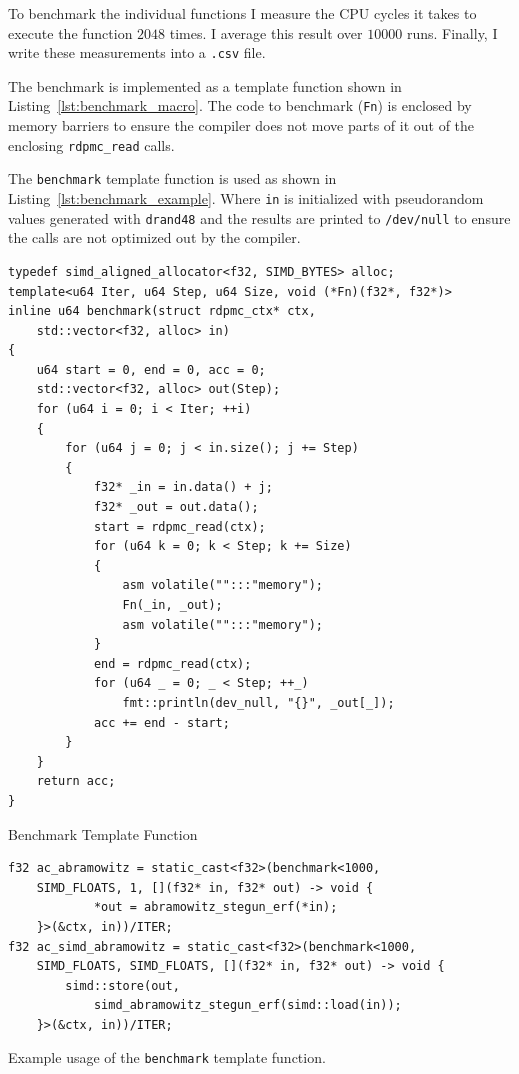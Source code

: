 \documentclass[a4paper, 11pt]{memoir}
\begin{document}
    To benchmark the individual functions I measure the CPU cycles it takes to execute the function $2048$ times. I average
    this result over $10000$ runs. Finally, I write these measurements into a \texttt{.csv} file.

    The benchmark is implemented as a template function shown in Listing~\ref{lst:benchmark_macro}. The code to benchmark
    (\texttt{Fn}) is enclosed by memory barriers to ensure the compiler does not move parts of it out of the
    enclosing \texttt{rdpmc_read} calls.

    The \texttt{benchmark} template function is used as shown in Listing~\ref{lst:benchmark_example}. Where
    \texttt{in} is initialized with pseudorandom values generated with \texttt{drand48} and the results
    are printed to \texttt{/dev/null} to ensure the calls are not optimized out by the compiler.

    \begin{listing}[t]
        \begin{verbatim}
typedef simd_aligned_allocator<f32, SIMD_BYTES> alloc;
template<u64 Iter, u64 Step, u64 Size, void (*Fn)(f32*, f32*)>
inline u64 benchmark(struct rdpmc_ctx* ctx,
    std::vector<f32, alloc> in)
{
    u64 start = 0, end = 0, acc = 0;
    std::vector<f32, alloc> out(Step);
    for (u64 i = 0; i < Iter; ++i)
    {
        for (u64 j = 0; j < in.size(); j += Step)
        {
            f32* _in = in.data() + j;
            f32* _out = out.data();
            start = rdpmc_read(ctx);
            for (u64 k = 0; k < Step; k += Size)
            {
                asm volatile("":::"memory");
                Fn(_in, _out);
                asm volatile("":::"memory");
            }
            end = rdpmc_read(ctx);
            for (u64 _ = 0; _ < Step; ++_)
                fmt::println(dev_null, "{}", _out[_]);
            acc += end - start;
        }
    }
    return acc;
}
        \end{verbatim}
        \caption{Benchmark Template Function}
        \label{lst:benchmark_macro}
    \end{listing}

    \begin{listing}[t]
        \begin{verbatim}
f32 ac_abramowitz = static_cast<f32>(benchmark<1000,
    SIMD_FLOATS, 1, [](f32* in, f32* out) -> void {
            *out = abramowitz_stegun_erf(*in);
    }>(&ctx, in))/ITER;
f32 ac_simd_abramowitz = static_cast<f32>(benchmark<1000,
    SIMD_FLOATS, SIMD_FLOATS, [](f32* in, f32* out) -> void {
        simd::store(out,
            simd_abramowitz_stegun_erf(simd::load(in));
    }>(&ctx, in))/ITER;
        \end{verbatim}
        \caption{Example usage of the \texttt{benchmark} template function.}
        \label{lst:benchmark_example}
    \end{listing}
\end{document}
